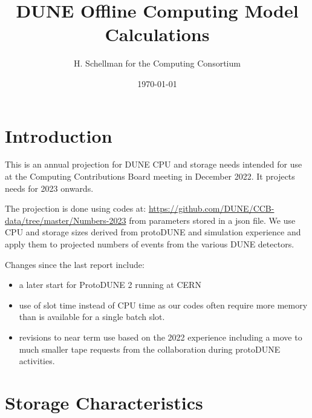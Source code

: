 \documentclass[12pt]{article}
\title{DUNE Offline Computing Model Calculations}
\author{H. Schellman for the Computing Consortium}
\date{\today}
\begin{document}
\makeatletter
{}
\makeatother
\newcommand{\csvautotabularright}[2][]{\csvloop{autotabularright={#2},#1}}

\maketitle
\section{Introduction}

This is an annual projection for DUNE CPU and storage needs intended for use at the Computing Contributions Board meeting in December 2022. It projects needs for 2023 onwards. 

The projection is done using codes at: \href{https://github.com/DUNE/CCB-data/tree/master/Numbers-2023}{https://github.com/DUNE/CCB-data/tree/master/Numbers-2023} from parameters stored in a json file. We use CPU and storage sizes derived from protoDUNE and simulation experience and apply them to projected numbers of events from the various DUNE detectors. 

Changes since the last report include:

\begin{itemize}
\item a later start for ProtoDUNE 2 running at CERN
\item use of slot time instead of CPU time as our codes often require more memory than is available for a single batch slot. 
\item revisions to near term use based on the 2022 experience including a move to much smaller tape requests from the collaboration during protoDUNE activities. 
\end{itemize}


\section{Storage Characteristics}
\end{document}
